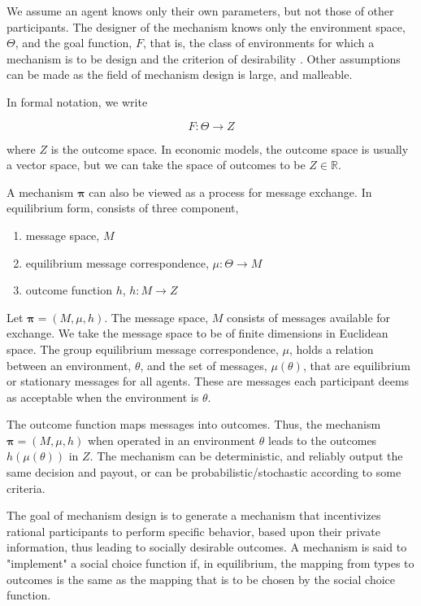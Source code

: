 \documentclass[12pt, titlepage, twocolumn]{report}
\begin{document}
We assume an agent knows only their own parameters, but not those of other participants. The designer of the mechanism knows only the environment space, \(\Theta\), and the goal function, \(F\), that is, the class of environments for which a mechanism is to be design and the criterion of desirability \cite{DEM}. Other assumptions can be made as the field of mechanism design is large, and malleable.

In formal notation, we write

\begin{equation}
	F : \Theta \rightarrow Z
\end{equation}

where \(Z\) is the outcome space. In economic models, the outcome space is usually a vector space, but we can take the space of outcomes to be \(Z \in \mathbb{R}\).

A mechanism \(\boldsymbol{\pi}\) can also be viewed as a process for message exchange. In equilibrium form, consists of three component,

\begin{enumerate}
	\item message space, \(M\)
	\item equilibrium message correspondence, \(\mu : \Theta \rightarrow M\)
	\item outcome function \(h\), \(h : M \rightarrow Z\)
\end{enumerate}

Let \(\boldsymbol{\pi} = (M, \mu, h)\). The message space, \(M\) consists of messages available for exchange. We take the message space to be of finite dimensions in Euclidean space. The group equilibrium message correspondence, \(\mu\), holds a relation between an environment, \(\theta\), and the set of messages, \(\mu(\theta)\), that are equilibrium or stationary messages for all agents. These are messages each participant deems as acceptable when the environment is \(\theta\).

The outcome function maps messages into outcomes. Thus, the mechanism \(\boldsymbol{\pi} = (M, \mu, h)\) when operated in an environment \(\theta\) leads to the outcomes \(h(\mu(\theta))\) in \(Z\). The mechanism can be deterministic, and reliably output the same decision and payout, or can be probabilistic/stochastic according to some criteria.


The goal of mechanism design is to generate a mechanism that incentivizes rational participants to perform specific behavior, based upon their private information, thus leading to socially desirable outcomes. A mechanism is said to "implement" a social choice function if, in equilibrium, the mapping from types to outcomes is the same as the mapping that is to be chosen by the social choice function. 
\end{document}
